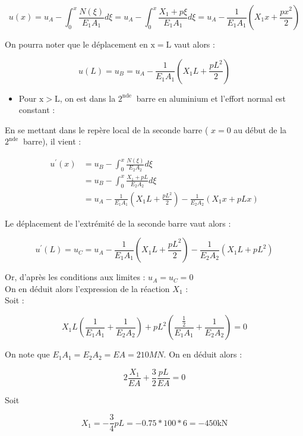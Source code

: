 \documentclass[11pt,a4paper]{report}
\begin{document}
\begin{enumerate}
{\begin{mdframed}
      $$
      u(x)=u_{A}-\int_{0}^{x} \frac{N(\xi)}{E_{1} A_{1}} d \xi=u_{A}-\int_{0}^{x} \frac{X_{1}+p \xi}{E_{1} A_{1}} d \xi=u_{A}-\frac{1}{E_{1} A_{1}}\left(X_{1} x+\frac{p x^{2}}{2}\right)
      $$

      On pourra noter que le déplacement en $\mathrm{x}=\mathrm{L}$ vaut alors :

      $$
      u(L)=u_{B}=u_{A}-\frac{1}{E_{1} A_{1}}\left(X_{1} L+\frac{p L^{2}}{2}\right)
      $$

      \begin{itemize}
        \item Pour $\mathrm{x}>\mathrm{L}$, on est dans la $2^{\text {nde }}$ barre en aluminium et l'effort normal est constant :
      \end{itemize}

      En se mettant dans le repère local de la seconde barre ( $x=0$ au début de la $2^{\text {nde }}$ barre), il vient :

      \begin{align*}
      u^{\prime}(x)& =u_{B}-\int_{0}^{x} \frac{N(\xi)}{E_{2} A_{2}} d \xi\\
       & =u_{B}-\int_{0}^{x} \frac{X_{1}+p L}{E_{2} A_{2}} d \xi\\
       & =u_{A}-\frac{1}{E_{1} A_{1}}\left(X_{1} L+\frac{p L^{2}}{2}\right)-\frac{1}{E_{2} A_{2}}\left(X_{1} x+p L x\right)
      \end{align*}

      Le déplacement de l'extrémité de la seconde barre vaut alors :

      $$
      u^{\prime}(L)=u_{C}=u_{A}-\frac{1}{E_{1} A_{1}}\left(X_{1} L+\frac{p L^{2}}{2}\right)-\frac{1}{E_{2} A_{2}}\left(X_{1} L+p L^{2}\right)
      $$

      Or, d'après les conditions aux limites : $u_{A}=u_{C}=0$\\
      On en déduit alors l'expression de la réaction $X_{1}$ :\\
      Soit :

      $$
      X_{1} L\left(\frac{1}{E_{1} A_{1}}+\frac{1}{E_{2} A_{2}}\right)+p L^{2}\left(\frac{\frac{1}{2}}{E_{1} A_{1}}+\frac{1}{E_{2} A_{2}}\right)=0
      $$

      On note que $E_{1} A_{1}=E_{2} A_{2}=E A=210 M N$. On en déduit alors :

      $$
      2 \frac{X_{1}}{E A}+\frac{3}{2}\frac{p L}{E A}=0
      $$

      Soit

      $$
      X_{1}=-\frac{3}{4} p L=- 0.75 * 100 * 6=-450 \mathrm{kN}
      $$


\end{mdframed}}
\end{enumerate}
\end{document}
